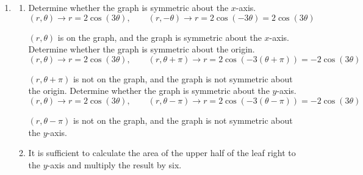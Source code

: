 \documentclass[a4paper, 12pt]{article}
\begin{document}
\newpage
{}
{}



\begin{enumerate}[leftmargin=*,label=\textbf{\arabic*.}]
\item \begin{enumerate}[leftmargin=*,label=\textbf{\alph*.}]
\item Determine whether the graph is symmetric about the $x$-axis.
\[(r,\theta)\rightarrow r=2\cos(3\theta),\qquad (r,-\theta)\rightarrow r=2\cos(-3\theta)=2\cos(3\theta)\]

$(r,\theta)$ is on the graph, and the graph is symmetric about the $x$-axis. Determine whether the graph is symmetric about the origin.
\[(r,\theta)\rightarrow r=2\cos(3\theta),\qquad (r,\theta+\pi)\rightarrow r=2\cos(-3(\theta+\pi))=-2\cos(3\theta)\]

$(r,\theta+\pi)$ is not on the graph, and the graph is not symmetric about the origin. Determine whether the graph is symmetric about the $y$-axis.
\[(r,\theta)\rightarrow r=2\cos(3\theta),\qquad (r,\theta-\pi)\rightarrow r=2\cos(-3(\theta-\pi))=-2\cos(3\theta)\]

$(r,\theta-\pi)$ is not on the graph, and the graph is not symmetric about the $y$-axis. 

\begin{center}
\end{center}

\item It is sufficient to calculate the area of the upper half of the leaf right to the $y$-axis and multiply the result by six.


\end{enumerate}
\end{enumerate}
\end{document}
